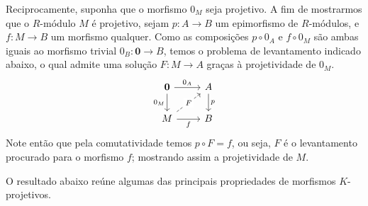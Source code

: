 \begin{exem}
  Reciprocamente, suponha que o morfismo $0_M$ seja projetivo.
  A fim de mostrarmos que o $R$-módulo $M$ é projetivo, sejam $p: A \to B$ um epimorfismo de $R$-módulos, e $f: M \to B$ um morfismo qualquer.
  Como as composições $p \circ 0_A$ e $f \circ 0_M$ são ambas iguais ao morfismo trivial $0_B: \mathbf{0} \to B$, temos o problema de levantamento indicado abaixo, o qual admite uma solução $F: M \to A$ graças à projetividade de $0_M$.
  \begin{displaymath}
    \begin{tikzcd}
      \mathbf{0}
      \arrow[r, "0_A"]
      \arrow[d, "0_M" swap]
      & A
      \arrow[d, "p"]
      \\ M
      \arrow[r, "f" swap]
      \arrow[ru, dashed, "F" description]
      & B
    \end{tikzcd}
  \end{displaymath}
  Note então que pela comutatividade temos $p \circ F = f$, ou  seja, $F$ é o levantamento procurado para o morfismo $f$; mostrando assim a projetividade de $M$.
\end{exem}

O resultado abaixo reúne algumas das principais propriedades de morfismos $K$-projetivos.

